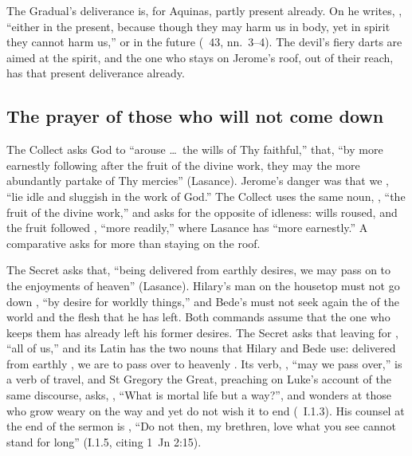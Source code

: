 The Gradual's deliverance is, for Aquinas, partly present already. On
 he writes, ,
``either in the present, because though they may harm us in body, yet in spirit
they cannot harm us,'' or in the future (~43, nn.~3--4).
The devil's fiery darts are aimed at the spirit, and the one who stays on
Jerome's roof, out of their reach, has that present deliverance already.

\subsection{The prayer of those who will not come down}
\label{sec:flight-orations}

The Collect asks God to ``arouse \dots\ the wills of Thy faithful,'' that,
``by more earnestly following after the fruit of the divine work, they may
the more abundantly partake of Thy mercies'' (Lasance). Jerome's danger was
that we , ``lie idle and sluggish in the
work of God.'' The Collect uses the same noun, ,
``the fruit of the divine work,'' and asks for the opposite of idleness:
wills roused, and the fruit followed , ``more readily,''
where Lasance has ``more earnestly.'' A comparative asks for more than
staying on the roof.

The Secret asks that, ``being delivered from earthly desires, we may pass on
to the enjoyments of heaven'' (Lasance). Hilary's man on the housetop must
not go down , ``by desire for worldly
things,'' and Bede's must not seek again the  of the world
and the flesh that he has left. Both commands assume that the one who keeps
them has already left his former desires. The Secret asks that leaving for
, ``all of us,'' and its Latin has the two nouns that
Hilary and Bede use: delivered from earthly , we are to
pass over to heavenly . Its verb, , ``may
we pass over,'' is a verb of travel, and St Gregory the Great, preaching on
Luke's account of the same discourse, asks, , ``What is mortal life but a way?'', and wonders at those who grow
weary on the way and yet do not wish it to end
(~I.1.3). His counsel at the end of the sermon is
,
``Do not then, my brethren, love what you see cannot stand for long'' (I.1.5,
citing 1~Jn 2:15).

